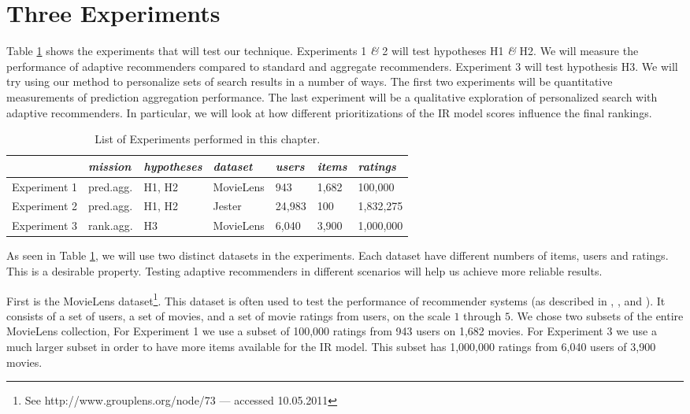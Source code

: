 \section{Three Experiments}

Table \ref{table:experiments} shows the experiments that will test our technique.
Experiments 1 \emph{\&} 2 will test hypotheses H1 \emph{\&} H2.
We will measure the performance of adaptive recommenders compared to standard and aggregate recommenders.
Experiment 3 will test hypothesis H3.
We will try using our method to personalize sets of search results in a number of ways.
The first two experiments will be quantitative measurements of prediction aggregation performance.
The last experiment will be a qualitative exploration of personalized search with adaptive recommenders.
In particular, we will look at how different prioritizations of the IR model scores influence the final rankings.

\vspace{1em}
\begin{table}[h]
  \begin{tabular*}{\textwidth}{ l l l l l l l }
    \toprule
      ~ & 
      \emph{mission} &
      \emph{hypotheses} &
      \emph{dataset} &
      \emph{users} &
      \emph{items} &
      \emph{ratings} \\
    \midrule
    
    Experiment 1 &
    pred.agg. &
    H1, H2 &
    MovieLens &
    943 &
    1,682 &
    100,000 \\
    
    Experiment 2 &
    pred.agg. &
    H1, H2 &
    Jester &
    24,983 &
    100 &
    1,832,275 \\

    Experiment 3 &
    rank.agg. &
    H3 &
    MovieLens &
    6,040 &
    3,900 &
    1,000,000 \\
    
    \bottomrule 
  \end{tabular*}
  \caption[List of Experiments]{List of Experiments performed in this chapter.}
  \label{table:experiments}
\end{table}

\noindent
As seen in Table \ref{table:experiments}, 
we will use two distinct datasets in the experiments.
Each dataset have different numbers of items, users and ratings.
This is a desirable property.
Testing adaptive recommenders in different scenarios
will help us achieve more reliable results.

First is the MovieLens dataset\footnote{
See http://www.grouplens.org/node/73 --- accessed 10.05.2011}.
This dataset is often used to test the performance of recommender systems
(as described in 
\citet[p9]{Alshamri2008}, \citet[p4]{Lemire2005}, \citet[p1]{Adomavicius2005} and \citet[p2]{Herlocker2004}).
It consists of a set of users, a set of movies, and a set of movie ratings from users,
on the scale $1$ through $5$.
We chose two subsets of the entire MovieLens collection, 
For Experiment 1 we use a subset of 100,000 ratings from 943 users on 1,682 movies.
For Experiment 3 we use a much larger subset in order to
have more items available for the IR model.
This subset has 1,000,000 ratings from 6,040 users of 3,900 movies.

